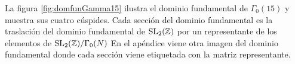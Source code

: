\documentclass[../../tesis_maestria]{subfiles}
\begin{document}

La figura \ref{fig:domfunGamma15} ilustra el dominio fundamental de $\Gamma_0(15)$ y muestra sus
cuatro c\'uspides. Cada secci\'on del dominio fundamental es la traslaci\'on del dominio
fundamental de $\mathrm{SL}_2(\mathbb{Z})$ por un representante de los elementos de $\mathrm{SL}_2(\mathbb{Z})/\Gamma_0(N)$
En el ap\'endice viene otra imagen del dominio fundamental donde cada secci\'on viene
etiquetada con la matriz representante.
\end{document}
